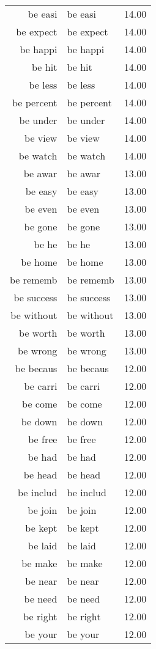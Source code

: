\begin{table}[ht]
\begin{tabular}{rlr}
  be easi & be easi & 14.00 \\ 
  be expect & be expect & 14.00 \\ 
  be happi & be happi & 14.00 \\ 
  be hit & be hit & 14.00 \\ 
  be less & be less & 14.00 \\ 
  be percent & be percent & 14.00 \\ 
  be under & be under & 14.00 \\ 
  be view & be view & 14.00 \\ 
  be watch & be watch & 14.00 \\ 
  be awar & be awar & 13.00 \\ 
  be easy & be easy & 13.00 \\ 
  be even & be even & 13.00 \\ 
  be gone & be gone & 13.00 \\ 
  be he & be he & 13.00 \\ 
  be home & be home & 13.00 \\ 
  be rememb & be rememb & 13.00 \\ 
  be success & be success & 13.00 \\ 
  be without & be without & 13.00 \\ 
  be worth & be worth & 13.00 \\ 
  be wrong & be wrong & 13.00 \\ 
  be becaus & be becaus & 12.00 \\ 
  be carri & be carri & 12.00 \\ 
  be come & be come & 12.00 \\ 
  be down & be down & 12.00 \\ 
  be free & be free & 12.00 \\ 
  be had & be had & 12.00 \\ 
  be head & be head & 12.00 \\ 
  be includ & be includ & 12.00 \\ 
  be join & be join & 12.00 \\ 
  be kept & be kept & 12.00 \\ 
  be laid & be laid & 12.00 \\ 
  be make & be make & 12.00 \\ 
  be near & be near & 12.00 \\ 
  be need & be need & 12.00 \\ 
  be right & be right & 12.00 \\ 
  be your & be your & 12.00 \\ 

\end{tabular}
\end{table}
